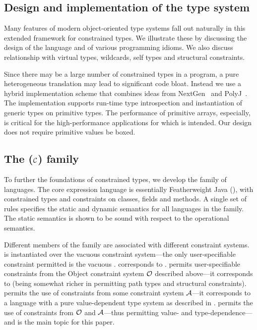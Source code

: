 \subsection{Design and implementation of the \Xten{} type system}

Many features of modern object-oriented type systems fall out
naturally in this extended framework for constrained types.
%
We illustrate these by discussing the design of
the \Xten{} language and of various
programming idioms.
We also discuss relationship with virtual types, \Java{} wildcards,
self types and structural constraints.

Since there may be a large number of constrained types
in a program, a pure heterogeneous translation may lead to significant
code bloat. Instead we use a hybrid implementation scheme that
combines ideas from NextGen~\cite{nextgen,allen03,allen04} and
PolyJ~\cite{java-popl97}. The implementation supports run-time type
introspection and instantiation of generic types on primitive types.
The performance of primitive arrays, especially, is critical for the
high-performance applications for which \Xten{} is intended.  Our
design does not require primitive values be boxed.

\subsection{The \FX($\cal C$) family}
To further the foundations of constrained types, we develop the \FX{}
family of languages. The core expression language is essentially
Featherweight Java (\FJ \cite{FJ}), with constrained types and constraints on classes, fields
and methods. A single set of rules specifies the static and dynamic
semantics for all languages in the family.  The static semantics is
shown to be sound with respect to the operational semantics.

Different members of the family are associated with different
constraint systems. \FXZ{} is
\FX{} instantiated over the vacuous constraint system---the only
user-specifiable constraint permitted is the vacuous . \FXZ{}
corresponds to \FJ. \FXG{} permits user-specifiable constraints from the 
Object constraint system $\cal O$ described above---it corresponds to
\FGJ{} (being somewhat richer in permitting path types and
structural constraints). \FXD{} permits
the use of constraints from some constraint system $\cal A$---it
corresponds to a language with a pure value-dependent type system as
described in \cite{constrained-types}. \FXGD{} permits the use of constraints
from $\cal O$ and $\cal A$---thus permitting value- and
type-dependence---and is the main topic for this paper.


